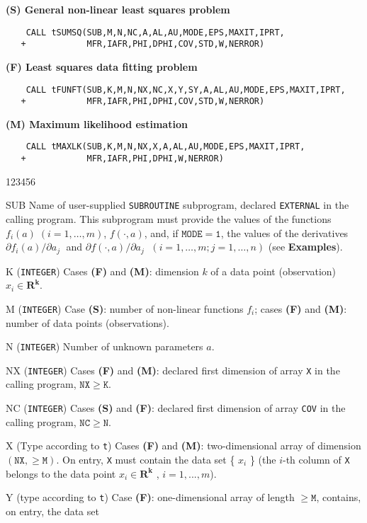 {\bf (S) General non-linear least squares problem}
\begin{verbatim}
    CALL tSUMSQ(SUB,M,N,NC,A,AL,AU,MODE,EPS,MAXIT,IPRT,
   +            MFR,IAFR,PHI,DPHI,COV,STD,W,NERROR)
\end{verbatim}
{\bf (F) Least squares data fitting problem}
\begin{verbatim}
    CALL tFUNFT(SUB,K,M,N,NX,NC,X,Y,SY,A,AL,AU,MODE,EPS,MAXIT,IPRT,
   +            MFR,IAFR,PHI,DPHI,COV,STD,W,NERROR)
\end{verbatim}
{\bf (M) Maximum likelihood estimation}
\begin{verbatim}
    CALL tMAXLK(SUB,K,M,N,NX,X,A,AL,AU,MODE,EPS,MAXIT,IPRT,
   +            MFR,IAFR,PHI,DPHI,W,NERROR)
\end{verbatim}
\begin{DLtt}{123456}
\item[SUB] Name of user-supplied {\tt SUBROUTINE} subprogram,
declared {\tt EXTERNAL} in the calling program.
This subprogram must provide the values of the functions
$f_i(a) \; (i=1, \ldots , m)$,  $f( \cdot , a)$,
and, if $\mathtt{MODE = 1}$, the values of the derivatives
$\partial f_i(a) / \partial a_j  \; $ and
$\partial f(\cdot , a) / \partial a_j  \; $
$(i=1, \ldots , m ; j=1, \ldots ,n)$  (see {\bf Examples}).
\item[K] ({\tt INTEGER}) Cases {\bf (F)} and {\bf (M)}: dimension $k$
of a data point (observation) $x_i \in \mathbf{R^k}$.
\item[M] ({\tt INTEGER}) Case {\bf (S)}:
number of non-linear functions $f_i$;
cases {\bf (F)} and {\bf (M)}: number of data points (observations).
\item[N] ({\tt INTEGER}) Number of unknown parameters $a$.
\item[NX] ({\tt INTEGER}) Cases {\bf (F)} and {\bf (M)}: declared first
dimension of array {\tt X} in the calling program, $\mathtt{NX \ge K}$.
\item[NC] ({\tt INTEGER}) Cases {\bf (S)} and {\bf (F)}: declared
first dimension of array {\tt COV} in the calling program,
$\mathtt{ NC \ge N}$.
\item[X] (Type according to {\tt t}) Cases {\bf (F)} and {\bf (M)}:
two-dimensional array of dimension $\mathtt{(NX , \ge M)}$.
On entry, {\tt X} must contain the data set \{ $x_i$ \} (the $i$-th
column of {\tt X} belongs to the data point $x_i \in \mathbf{R^k}$ ,
    $i=1,...,m$).
\item[Y] (type according to {\tt t}) Case {\bf (F)}: one-dimensional
array of length $\mathtt{ \ge M}$, contains, on entry, the data set

\end{DLtt}
